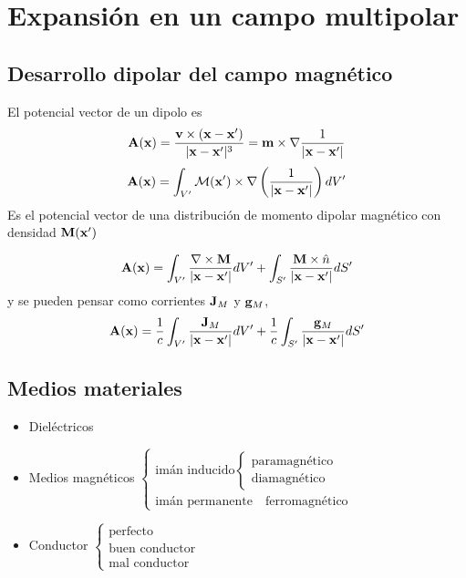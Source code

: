 \documentclass[10pt,oneside]{CBFT_book}
\begin{document}
\chapter{Expansión en un campo multipolar}

\section{Desarrollo dipolar del campo magnético}

El potencial vector de un dipolo es
\[
	\vb{A}(\vb{x}) = \frac{\vb{v}\times(\vb{x}-\vb{x}')}{|\vb{x}-\vb{x}'|^3} = \vb{m} \times \Nabla 
		\frac{1}{|\vb{x}-\vb{x}'|}
\]
\[
	\vb{A}(\vb{x}) = \int_{V'} \vb{\mathcal{M}}(\vb{x}') \times \Nabla 
			\left(\frac{1}{|\vb{x}-\vb{x}'|}\right) dV'
\]
Es el potencial vector de una distribución de momento dipolar magnético con densidad $ \vb{M}(\vb{x}')$

\[
	\vb{A}(\vb{x}) = \int_{V'} \frac{\rotorm{\vb{M}}}{|\vb{x}-\vb{x}'|} dV' +
			\int_{S'} \frac{\vb{M}\times\hat{n}}{|\vb{x}-\vb{x}'|} dS'
\]
y se pueden pensar como corrientes $\vb{J}_M$ y $\vb{g}_M$,
\[
	\vb{A}(\vb{x}) = \frac{1}{c} \int_{V'} \frac{\vb{J}_M}{|\vb{x}-\vb{x}'|} dV' +
			\frac{1}{c} \int_{S'} \frac{\vb{g}_M}{|\vb{x}-\vb{x}'|} dS'
\]

\section{Medios materiales}

\begin{itemize}
 \item Dieléctricos
 \item Medios magnéticos
	$\begin{cases}
	 \text{imán inducido}
		\begin{cases}
		\text{paramagnético} \\
		\text{diamagnético}
		\end{cases} \\
	 \text{imán permanente} \quad \text{ferromagnético}
	\end{cases}$
 \item Conductor
	$\begin{cases}
	 \text{perfecto} \\
	 \text{buen conductor} \\
	 \text{mal conductor}
	\end{cases}$
\end{itemize}
\end{document}
